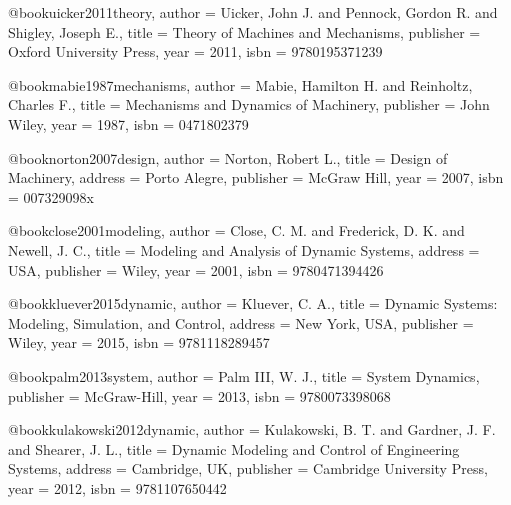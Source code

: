 @book{uicker2011theory,
  author = {Uicker, John J. and Pennock, Gordon R. and Shigley, Joseph E.},
  title = {Theory of Machines and Mechanisms},
  publisher = {Oxford University Press},
  year = {2011},
  isbn = {9780195371239}
}

@book{mabie1987mechanisms,
  author = {Mabie, Hamilton H. and Reinholtz, Charles F.},
  title = {Mechanisms and Dynamics of Machinery},
  publisher = {John Wiley},
  year = {1987},
  isbn = {0471802379}
}

@book{norton2007design,
  author = {Norton, Robert L.},
  title = {Design of Machinery},
  address = {Porto Alegre},
  publisher = {McGraw Hill},
  year = {2007},
  isbn = {007329098x}
}

%

@book{close2001modeling,
  author = {Close, C. M. and Frederick, D. K. and Newell, J. C.},
  title = {Modeling and Analysis of Dynamic Systems},
  address = {USA},
  publisher = {Wiley},
  year = {2001},
  isbn = {9780471394426}
}

@book{kluever2015dynamic,
  author = {Kluever, C. A.},
  title = {Dynamic Systems: Modeling, Simulation, and Control},
  address = {New York, USA},
  publisher = {Wiley},
  year = {2015},
  isbn = {9781118289457}
}

@book{palm2013system,
  author = {Palm III, W. J.},
  title = {System Dynamics},
  publisher = {McGraw-Hill},
  year = {2013},
  isbn = {9780073398068}
}

@book{kulakowski2012dynamic,
  author = {Kulakowski, B. T. and Gardner, J. F. and Shearer, J. L.},
  title = {Dynamic Modeling and Control of Engineering Systems},
  address = {Cambridge, UK},
  publisher = {Cambridge University Press},
  year = {2012},
  isbn = {9781107650442}
}

